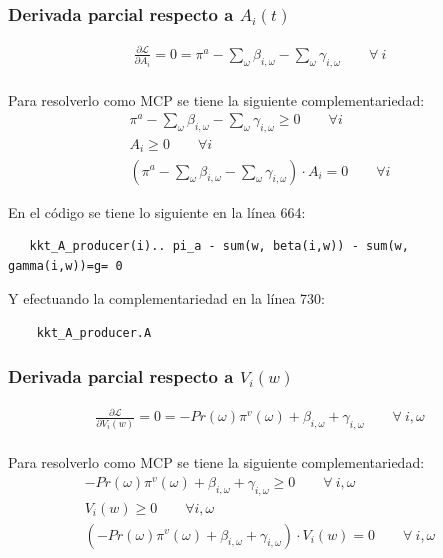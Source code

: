 \subsubsection{Derivada parcial respecto a $A_i(t)$}
\footnotesize{
\begin{align}
   \frac{\partial \mathcal{L} }{\partial A_i}= 0
   = \pi^{a} - \sum_{\omega}\beta_{i,\omega} - \sum_{\omega}\gamma_{i,\omega}  \qquad \forall \  i \\
\end{align}
}

Para resolverlo como MCP se tiene la siguiente complementariedad:
\footnotesize{
\begin{align}
    \pi^{a} - \sum_{\omega}\beta_{i,\omega} - \sum_{\omega}\gamma_{i,\omega} \geq 0 \qquad \forall  i\\
    A_i \geq 0 \qquad \forall  i\\
    (\pi^{a} - \sum_{\omega}\beta_{i,\omega} - \sum_{\omega}\gamma_{i,\omega}) \cdot A_i = 0 \qquad \forall  i
\end{align}
}

En el código se tiene lo siguiente en la línea 664:
\begin{verbatim}
   kkt_A_producer(i).. pi_a - sum(w, beta(i,w)) - sum(w, gamma(i,w))=g= 0 
\end{verbatim}

Y efectuando la complementariedad en la línea 730:
\begin{verbatim}
    kkt_A_producer.A
\end{verbatim}

\subsubsection{Derivada parcial respecto a $V_i(w)$}
\footnotesize{
\begin{align}
   \frac{\partial \mathcal{L} }{\partial V_i(w)}= 0
   = -Pr(\omega) \pi^v(\omega) + \beta_{i,\omega}  + \gamma_{i,\omega}  \qquad \forall \  i, \omega \\
\end{align}
}

Para resolverlo como MCP se tiene la siguiente complementariedad:
\footnotesize{
\begin{align}
    -Pr(\omega) \pi^v(\omega) + \beta_{i,\omega}  + \gamma_{i,\omega} \geq 0 \qquad \forall \  i, \omega \\
    V_i(w) \geq 0 \qquad \forall  i,\omega \\
    (-Pr(\omega) \pi^v(\omega) + \beta_{i,\omega}  + \gamma_{i,\omega}) \cdot  V_i(w) = 0  \qquad \forall \  i, \omega 
\end{align}
}

